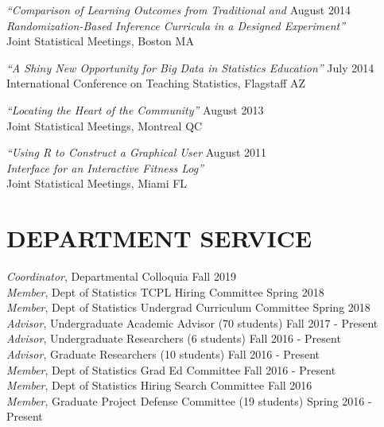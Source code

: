 \documentclass[margin, 10pt]{res}\usepackage[]{graphicx}\usepackage[]{color}
\begin{document}
\begin{resume}
{\sl ``Comparison of Learning Outcomes from Traditional and} \hfill August 2014 \\
{\sl Randomization-Based Inference Curricula in a Designed Experiment''}\\
Joint Statistical Meetings, Boston MA

{\sl ``A Shiny New Opportunity for Big Data in Statistics Education''} \hfill July 2014 \\
International Conference on Teaching Statistics, Flagstaff AZ

{\sl ``Locating the Heart of the Community''} \hfill August 2013 \\
Joint Statistical Meetings, Montreal QC

{\sl ``Using R to Construct a Graphical User} \hfill August 2011 \\
{\sl Interface for an Interactive Fitness Log''} \\
Joint Statistical Meetings, Miami FL \\

\vspace{0.1in}
\section{DEPARTMENT SERVICE}   
{\it Coordinator}, Departmental Colloquia \hfill Fall 2019 \\
{\it Member}, Dept of Statistics TCPL Hiring Committee \hfill  Spring 2018 \\
{\it Member}, Dept of Statistics Undergrad Curriculum Committee \hfill  Spring 2018 \\
{\it Advisor}, Undergraduate Academic Advisor (70 students) \hfill Fall 2017 - Present \\
{\it Advisor}, Undergraduate Researchers (6 students) \hfill Fall 2016 - Present \\
{\it Advisor}, Graduate Researchers (10 students) \hfill Fall 2016 - Present \\
{\it Member}, Dept of Statistics Grad Ed Committee \hfill  Fall 2016 - Present  \\
{\it Member}, Dept of Statistics Hiring Search Committee \hfill  Fall 2016  \\
{\it Member}, Graduate Project Defense Committee (19 students) \hfill Spring 2016 - Present \\


\end{resume}
\end{document}
